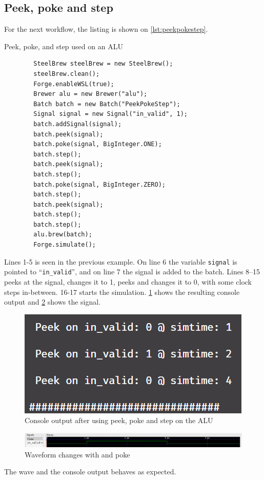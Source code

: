 \subsection{Peek, poke and step}
For the next workflow, the listing is shown on \cref{lst:peekpokestep}.
\begin{listing}
    \centering
    \caption{Peek, poke, and step used on an ALU}\label{lst:peekpokestep}
    \begin{verbatim}
        SteelBrew steelBrew = new SteelBrew();
        steelBrew.clean();
        Forge.enableWSL(true);
        Brewer alu = new Brewer("alu");
        Batch batch = new Batch("PeekPokeStep");
        Signal signal = new Signal("in_valid", 1);
        batch.addSignal(signal);
        batch.peek(signal);
        batch.poke(signal, BigInteger.ONE);
        batch.step();
        batch.peek(signal);
        batch.step();
        batch.poke(signal, BigInteger.ZERO);
        batch.step();
        batch.peek(signal);
        batch.step();
        batch.step();
        alu.brew(batch);
        Forge.simulate();
    \end{verbatim}
\end{listing}
Lines 1-5 is seen in the previous example. On line 6 the variable \texttt{signal} is pointed to ``\texttt{in\_valid}'', and on line 7 the signal is added to the batch. Lines 8–15 peeks at the signal, changes it to 1, peeks and changes it to 0, with some clock steps in-between. 16-17 starts the simulation. \cref{fig:peekpokestep} shows the resulting console output and \cref{fig:peekpokestepWave} shows the signal.
\begin{figure}
    \centering
    \caption{Console output after using peek, poke and step on the ALU}\label{fig:peekpokestep}
    \includegraphics[width=.3\textwidth]{graphics/peekpokestep.png}
\end{figure}
\begin{figure}
    \centering
    \caption{Waveform changes with and poke}\label{fig:peekpokestepWave}
    \includegraphics[width=\textwidth]{graphics/peekpokestepWave.png}
\end{figure}
The wave and the console output behaves as expected.
